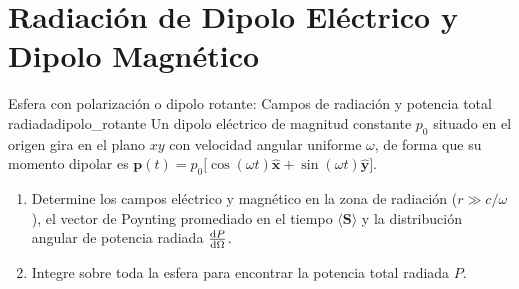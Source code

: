 \documentclass[11pt,a4paper]{book}
\newcommand{\xhat}{\hat{\bm{x}}}
\newcommand{\yhat}{\hat{\bm{y}}}
\newcommand{\Svec}{\bm{S}}
\begin{document}
\section{Radiación de Dipolo Eléctrico y Dipolo Magnético}

\begin{ejercicio}{Esfera con polarización o dipolo rotante: Campos de radiación y potencia total radiada}{dipolo_rotante}
Un dipolo eléctrico de magnitud constante $p_0$ situado en el origen gira en el plano $xy$ con velocidad angular uniforme $\omega$, de forma que su momento dipolar es $\bm{p}(t) = p_0\big[\cos(\omega t)\xhat + \sin(\omega t)\yhat\big]$.
\begin{enumerate}[label=\alph*)]
    \item Determine los campos eléctrico y magnético en la zona de radiación ($r \gg c/\omega$), el vector de Poynting promediado en el tiempo $\langle\Svec\rangle$ y la distribución angular de potencia radiada $\dv{P}{\Omega}$.
    \item Integre sobre toda la esfera para encontrar la potencia total radiada $P$.
\end{enumerate}
\end{ejercicio}
\end{document}
